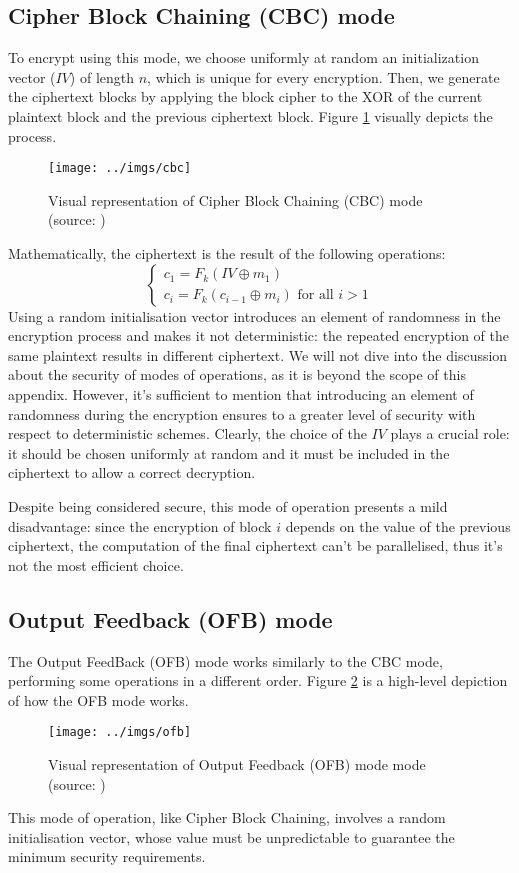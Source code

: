 \documentclass[12pt,a4paper]{book}
\theoremstyle{definition}
\begin{document}
	\subsection{Cipher Block Chaining (CBC) mode}
	To encrypt using this mode, we choose uniformly at random an initialization vector ($IV$) of length $n$, which is unique for every encryption. Then, we generate the ciphertext blocks by applying the block cipher to the XOR of the current plaintext block and the previous ciphertext block. Figure \ref{fig:cbc} visually depicts the process.
	\begin{figure}[!ht]
		\centering
		\texttt{[image: ../imgs/cbc]}
		\captionsetup{width=.7\linewidth}
		\caption{Visual representation of Cipher Block Chaining (CBC) mode (source: \cite{Katz2007})}
		\label{fig:cbc}
	\end{figure}
	Mathematically, the ciphertext is the result of the following operations:
	\[
	\begin{cases}
		c_1 = F_k(IV \oplus m_1)\\
		c_i = F_k(c_{i-1}\oplus m_i) \text{ for all } i>1
	\end{cases}
	\]
	Using a random initialisation vector introduces an element of randomness in the encryption process and makes it not deterministic: the repeated encryption of the same plaintext results in different ciphertext. 
	We will not dive into the discussion about the security of modes of operations, as it is beyond the scope of this appendix. However, it's sufficient to mention that introducing an element of randomness during the encryption ensures to a greater level of security with respect to deterministic schemes. Clearly, the choice of the $IV$ plays a crucial role: it should be chosen uniformly at random and it must be included in the ciphertext to allow a correct decryption.
	
	Despite being considered secure, this mode of operation presents a mild disadvantage: since the encryption of block $i$ depends on the value of the previous ciphertext, the computation of the final ciphertext can't be parallelised, thus it's not the most efficient choice.
 	\subsection{Output Feedback (OFB) mode}
 	The Output FeedBack (OFB) mode works similarly to the CBC mode, performing some operations in a different order. Figure \ref{fig:ofb} is a high-level depiction of how the OFB mode works.
 	\begin{figure}[!ht]
 		\centering
 		\texttt{[image: ../imgs/ofb]}
 		\captionsetup{width=.7\linewidth}
 		\caption{Visual representation of Output Feedback (OFB) mode mode (source: \cite{Katz2007})}
 		\label{fig:ofb}
 	\end{figure}
 	This mode of operation, like Cipher Block Chaining, involves a random initialisation vector, whose value must be unpredictable to guarantee the minimum security requirements.
 	
\end{document}
